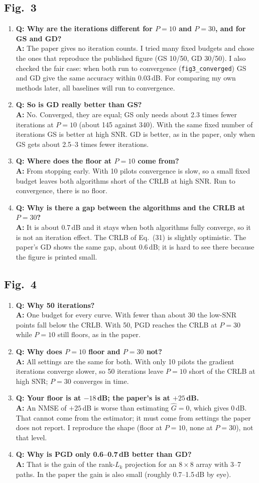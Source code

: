 \documentclass[11pt,a4paper]{article}
\newcommand{\file}[1]{\texttt{#1}}
\newcommand{\QA}[2]{\item \textbf{Q: #1}\\ \textbf{A:} #2}
\begin{document}
\subsection*{Fig.~3}
\begin{enumerate}[leftmargin=*,itemsep=4pt]
\QA{Why are the iterations different for $P=10$ and $P=30$, and for GS and GD?}
   {The paper gives no iteration counts. I tried many fixed budgets and chose the ones that
    reproduce the published figure (GS 10/50, GD 30/50). I also checked the fair case: when both
    run to convergence (\file{fig3\_converged}) GS and GD give the same accuracy within 0.03\,dB.
    For comparing my own methods later, all baselines will run to convergence.}
\QA{So is GD really better than GS?}
   {No. Converged, they are equal; GS only needs about 2.3 times fewer iterations at $P=10$
    (about 145 against 340). With the same fixed number of iterations GS is better at high SNR.
    GD is better, as in the paper, only when GS gets about 2.5--3 times fewer iterations.}
\QA{Where does the floor at $P=10$ come from?}
   {From stopping early. With 10 pilots convergence is slow, so a small fixed budget leaves both
    algorithms short of the CRLB at high SNR. Run to convergence, there is no floor.}
\QA{Why is there a gap between the algorithms and the CRLB at $P=30$?}
   {It is about 0.7\,dB and it stays when both algorithms fully converge, so it is not an
    iteration effect. The CRLB of Eq.~(31) is slightly optimistic. The paper's GD shows the same
    gap, about 0.6\,dB; it is hard to see there because the figure is printed small.}
\end{enumerate}

\subsection*{Fig.~4}
\begin{enumerate}[leftmargin=*,itemsep=4pt]
\QA{Why 50 iterations?}
   {One budget for every curve. With fewer than about 30 the low-SNR points fall below the CRLB.
    With 50, PGD reaches the CRLB at $P=30$ while $P=10$ still floors, as in the paper.}
\QA{Why does $P=10$ floor and $P=30$ not?}
   {All settings are the same for both. With only 10 pilots the gradient iterations converge
    slower, so 50 iterations leave $P=10$ short of the CRLB at high SNR; $P=30$ converges in time.}
\QA{Your floor is at $-18$\,dB; the paper's is at $+25$\,dB.}
   {An NMSE of $+25$\,dB is worse than estimating $\hat G=0$, which gives 0\,dB. That cannot come
    from the estimator; it must come from settings the paper does not report. I reproduce the
    shape (floor at $P=10$, none at $P=30$), not that level.}
\QA{Why is PGD only 0.6--0.7\,dB better than GD?}
   {That is the gain of the rank-$L_k$ projection for an $8\times8$ array with 3--7 paths. In the
    paper the gain is also small (roughly 0.7--1.5\,dB by eye).}
\end{enumerate}
\end{document}
